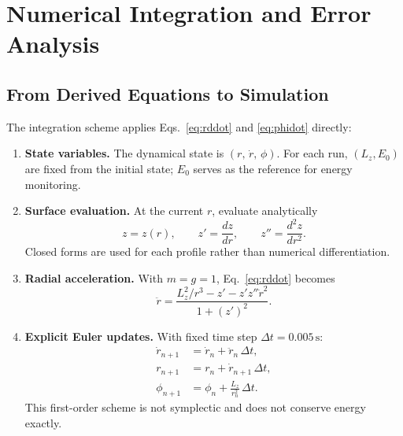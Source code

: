 \documentclass[11pt,letterpaper]{article}
\begin{document}
\section{Numerical Integration and Error Analysis}
\label{sec:numerical}

\subsection{From Derived Equations to Simulation}
\label{sec:simulation}

The integration scheme applies Eqs.~\eqref{eq:rddot} and \eqref{eq:phidot} directly:
\begin{enumerate}[leftmargin=2em, itemsep=0.7em, topsep=0.5em, label=\textbf{\arabic*.}]
    \item \textbf{State variables.}
    The dynamical state is $(r,\,\dot{r},\,\phi)$. For each run, $(L_z,E_0)$ are fixed from the initial state; $E_0$ serves as the reference for energy monitoring.

    \item \textbf{Surface evaluation.}
    At the current $r$, evaluate analytically
    \begin{equation*}
        z=z(r),\qquad z'=\frac{dz}{dr},\qquad z''=\frac{d^2z}{dr^2}.
    \end{equation*}
    Closed forms are used for each profile rather than numerical differentiation.

    \item \textbf{Radial acceleration.}
    With $m=g=1$, Eq.~\eqref{eq:rddot} becomes
    \begin{equation}\label{eq:accel_num}
        \ddot{r} = \frac{L_z^2/r^3 - z' - z' z'' \dot{r}^2}{1+(z')^2}.
    \end{equation}

    \item \textbf{Explicit Euler updates.}
    With fixed time step $\Delta t=0.005\,\mathrm{s}$:
    \begin{align}
        \dot{r}_{n+1} &= \dot{r}_n + \ddot{r}_n\,\Delta t, \\
        r_{n+1}       &= r_n + \dot{r}_{n+1}\,\Delta t, \\
        \phi_{n+1}    &= \phi_n + \frac{L_z}{r_n^2}\,\Delta t.
        \label{eq:euler}
    \end{align}
    This first-order scheme is not symplectic and does not conserve energy exactly.


\end{enumerate}
\end{document}
